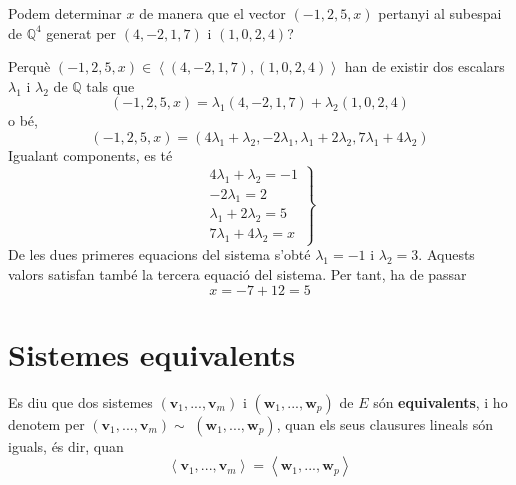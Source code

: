 \begin{exemple}
Podem determinar $x$ de manera que el vector $(-1,2,5,x)$
pertanyi al subespai de $\mathbb{Q}^{4}$ generat per $(4,-2,1,7)$ i $%
(1,0,2,4)$?

\end{exemple}
\begin{solucio}
Perquè $(-1,2,5,x)\in \left\langle (4,-2,1,7),(1,0,2,4)\right\rangle $
han de existir dos escalars $\lambda _{1}$ i $\lambda _{2}$ de $\mathbb{Q}$
tals que%
\begin{equation*}
(-1,2,5,x)=\lambda _{1}(4,-2,1,7)+\lambda _{2}(1,0,2,4)
\end{equation*}%
o bé,%
\begin{equation*}
(-1,2,5,x)=(4\lambda _{1}+\lambda _{2},-2\lambda _{1},\lambda _{1}+2\lambda
_{2},7\lambda _{1}+4\lambda _{2})
\end{equation*}%
Igualant components, es té%
\begin{equation*}
\left. 
\begin{array}{r}
4\lambda _{1}+\lambda _{2}=-1 \\ 
-2\lambda _{1}=2 \\ 
\lambda _{1}+2\lambda _{2}=5 \\ 
7\lambda _{1}+4\lambda _{2}=x%
\end{array}%
\right\}
\end{equation*}%
De les dues primeres equacions del sistema s’obté $\lambda _{1}=-1$ i $%
\lambda _{2}=3$. Aquests valors satisfan també la tercera equació del sistema. Per tant, ha de passar%
\begin{equation*}
x=-7+12=5
\end{equation*}
\end{solucio}

\section{Sistemes equivalents}

\begin{definicio}
Es diu que dos sistemes $(\mathbf{v}_{1},...,\mathbf{v}_{m})$ i $(\mathbf{w}%
_{1},...,\mathbf{w}_{p})$ de $E$ són \textbf{equivalents}, i ho denotem per $(\mathbf{v}_{1},...,\mathbf{v}_{m})\sim $ $(\mathbf{w}%
_{1},...,\mathbf{w}_{p})$, quan els seus clausures lineals són iguals, és
dir, quan%
\begin{equation*}
\left\langle \mathbf{v}_{1},...,\mathbf{v}_{m}\right\rangle =\left\langle 
\mathbf{w}_{1},...,\mathbf{w}_{p}\right\rangle
\end{equation*}
\end{definicio}


